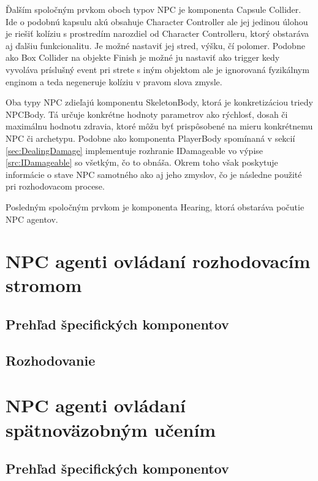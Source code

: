 \documentclass[slovak, master]{diploma}
\begin{document}
Ďalším spoločným prvkom oboch typov NPC je komponenta Capsule Collider. Ide o podobnú kapsulu akú obsahuje Character Controller ale jej jedinou úlohou je riešiť kolíziu s prostredím narozdiel od Character Controlleru, ktorý obstaráva aj ďalšiu funkcionalitu. Je možné nastaviť jej stred, výšku, čí polomer. Podobne ako Box Collider na objekte Finish je možné ju nastaviť ako trigger kedy vyvoláva príslušný event pri strete s iným objektom ale je ignorovaná fyzikálnym enginom a teda negeneruje kolíziu v pravom slova zmysle.

Oba typy NPC zdieľajú komponentu SkeletonBody, ktorá je konkretizáciou triedy NPCBody. Tá určuje konkrétne hodnoty parametrov ako rýchlosť, dosah či maximálnu hodnotu zdravia, ktoré môžu byť prispôsobené na mieru konkrétnemu NPC či archetypu. Podobne ako komponenta PlayerBody spomínaná v sekcií \ref{sec:DealingDamage} implementuje rozhranie IDamageable vo výpise \ref{src:IDamageable} so všetkým, čo to obnáša. Okrem toho však poskytuje informácie o stave NPC samotného ako aj jeho zmyslov, čo je následne použité pri rozhodovacom procese.

Posledným spoločným prvkom je komponenta Hearing, ktorá obstaráva počutie NPC agentov. 

\section{NPC agenti ovládaní rozhodovacím stromom}
\label{sec:AgentsWithTrees}

\subsection{Prehľad špecifických komponentov}
\label{sec:AgentsWithTreesComponentOverview} 

\subsection{Rozhodovanie}
\label{sec:ImplDecisionTrees}

\section{NPC agenti ovládaní spätnoväzobným učením}
\label{sec:AgentsWithBrain}
\subsection{Prehľad špecifických komponentov}
\label{secAgentsWithBrainComponentOverview} 
\end{document}

